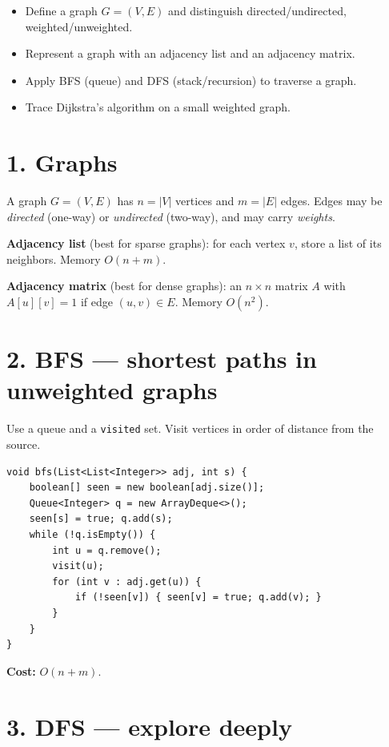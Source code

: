 \documentclass[11pt]{article}
\begin{document}

\begin{objbox}
\begin{itemize}[leftmargin=*]
  \item Define a graph $G=(V,E)$ and distinguish directed/undirected, weighted/unweighted.
  \item Represent a graph with an adjacency list and an adjacency matrix.
  \item Apply BFS (queue) and DFS (stack/recursion) to traverse a graph.
  \item Trace Dijkstra's algorithm on a small weighted graph.
\end{itemize}
\end{objbox}

\section*{1. Graphs}

A graph $G = (V, E)$ has $n = |V|$ vertices and $m = |E|$ edges. Edges may be \emph{directed} (one-way) or \emph{undirected} (two-way), and may carry \emph{weights}.

\textbf{Adjacency list} (best for sparse graphs): for each vertex $v$, store a list of its neighbors. Memory $O(n+m)$.

\textbf{Adjacency matrix} (best for dense graphs): an $n\times n$ matrix $A$ with $A[u][v]=1$ if edge $(u,v)\in E$. Memory $O(n^2)$.

\section*{2. BFS --- shortest paths in unweighted graphs}

Use a queue and a \texttt{visited} set. Visit vertices in order of distance from the source.

\begin{lstlisting}
void bfs(List<List<Integer>> adj, int s) {
    boolean[] seen = new boolean[adj.size()];
    Queue<Integer> q = new ArrayDeque<>();
    seen[s] = true; q.add(s);
    while (!q.isEmpty()) {
        int u = q.remove();
        visit(u);
        for (int v : adj.get(u)) {
            if (!seen[v]) { seen[v] = true; q.add(v); }
        }
    }
}
\end{lstlisting}

\textbf{Cost:} $O(n + m)$.

\section*{3. DFS --- explore deeply}
\end{document}
